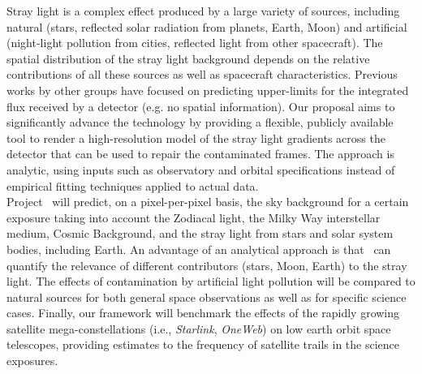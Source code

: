 \documentclass[usenames,dvipsnames,modern]{CLASS_FILES/aastex631}  %
\begin{document}
Stray light is a complex effect produced by a large variety of sources, including natural (stars, reflected solar radiation from planets, Earth, Moon) and artificial (night-light pollution from cities, reflected light from other spacecraft). The spatial distribution of the stray light background depends on the relative contributions of all these sources as well as spacecraft characteristics. Previous works by other groups have focused on predicting upper-limits for the integrated flux received by a detector (e.g. no spatial information). Our proposal aims to significantly advance the technology by providing a flexible, publicly available tool  to render a high-resolution model of the stray light gradients across the detector that can be used to repair the contaminated frames. The approach is analytic, using inputs such as observatory and orbital specifications instead of empirical fitting techniques applied to actual data.\\


Project \MyName\  will predict, on a pixel-per-pixel basis, the sky background for a certain exposure taking into account the Zodiacal light, the Milky Way interstellar medium, Cosmic Background, and the stray light from stars and solar system bodies, including Earth.  An advantage of an analytical approach is that \MyName\ can quantify the relevance of different contributors (stars, Moon, Earth) to the stray light. The effects of contamination by artificial light pollution will be compared to  natural sources for both general space observations as well as for specific science cases. Finally, our framework will benchmark the effects of the rapidly growing satellite mega-constellations (i.e., \emph{Starlink}, \emph{OneWeb}) on low earth orbit space telescopes, providing estimates to the frequency of satellite trails in the science exposures. 





\end{document}
